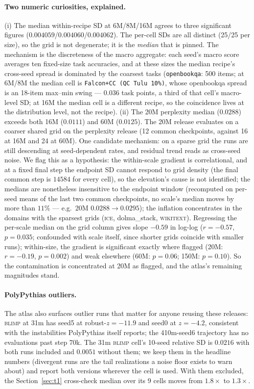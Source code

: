 \paragraph{Two numeric curiosities, explained.}
(i) The median within-recipe SD at 6M/8M/16M agrees to three significant figures
($0.004059$/$0.004060$/$0.004062$). The per-cell SDs are all distinct (25/25 per size), so the
grid is not degenerate; it is the \emph{median} that is pinned. The mechanism is the
discreteness of the macro aggregate: each seed's macro score averages ten fixed-size task
accuracies, and at these sizes the median recipe's cross-seed spread is dominated by the
coarsest tasks (\texttt{openbookqa}: 500 items; at 6M/8M the median cell is
\texttt{Falcon+CC (QC Tulu 10\%)}, whose openbookqa spread is an 18-item max--min swing ---
$0.036$ task points, a third of that cell's macro-level SD; at 16M the median cell is a
different recipe, so the coincidence lives at the distribution level, not the recipe). (ii) The 20M perplexity median
($0.0288$) exceeds both 16M ($0.0111$) and 60M ($0.0125$). The 20M release evaluates on a coarser shared grid on the perplexity release
(12 common checkpoints, against 16 at 16M and 24 at 60M). One candidate mechanism: on a sparse
grid the runs are still descending at seed-dependent rates, and residual trend reads as
cross-seed noise. We flag this as a hypothesis: the within-scale gradient is correlational,
and at a fixed final step the endpoint SD cannot respond to grid density (the final common
step is $14584$ for every cell), so the elevation's cause is not identified; the
medians are nonetheless insensitive to the endpoint window (recomputed on per-seed means of
the last two common checkpoints, no scale's median moves by more than $11\%$ --- e.g.\ 20M
$0.0288 \to 0.0295$); the inflation
concentrates in the domains with the sparsest grids (\textsc{ice}, dolma\_stack,
\textsc{wikitext}). Regressing the per-scale median on the grid column gives
slope $-0.59$ in log-log ($r = -0.57$, $p = 0.035$; confounded with scale itself, since
shorter grids coincide with smaller runs); within-size, the gradient is significant exactly
where flagged (20M: $r = -0.19$, $p = 0.002$) and weak elsewhere (60M: $p = 0.06$; 150M:
$p = 0.10$). So the contamination is concentrated at 20M as flagged, and the atlas's remaining
magnitudes stand.

\paragraph{PolyPythias outliers.}
The atlas also surfaces outlier runs that matter for anyone reusing these
releases: \textsc{blimp} at 31m has seed5 at robust-$z = -11.9$ and seed0 at $z = -4.2$,
consistent with the instabilities PolyPythias itself reports; the 410m-seed6 trajectory has no
evaluations past step 70k. The 31m \textsc{blimp} cell's 10-seed relative SD is $0.0216$ with
both runs included and $0.0051$ without them; we keep them in the headline numbers (divergent
runs are the tail realizations a noise floor exists to warn about) and report both versions
wherever the cell is used. With them excluded, the Section~\ref{sec:t1} cross-check median
over its 9 cells moves from $1.8\times$ to $1.3\times$.
